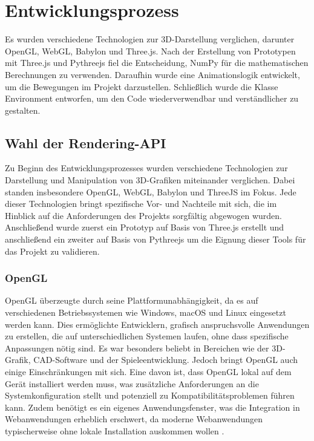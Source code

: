 \section{Entwicklungsprozess}
Es wurden verschiedene Technologien zur 3D-Darstellung verglichen, darunter OpenGL, WebGL, Babylon und Three.js.
Nach der Erstellung von Prototypen mit Three.js und Pythreejs fiel die Entscheidung, NumPy für die mathematischen Berechnungen zu verwenden.
Daraufhin wurde eine Animationslogik entwickelt, um die Bewegungen im Projekt darzustellen. Schließlich wurde die Klasse Environment entworfen,
um den Code wiederverwendbar und verständlicher zu gestalten.

\subsection{Wahl der Rendering-API}
Zu Beginn des Entwicklungsprozesses wurden verschiedene Technologien zur Darstellung und Manipulation von 3D-Grafiken miteinander verglichen.
Dabei standen insbesondere OpenGL, WebGL, Babylon und ThreeJS im Fokus.
Jede dieser Technologien bringt spezifische Vor- und Nachteile mit sich, die im Hinblick auf die Anforderungen des Projekts sorgfältig abgewogen wurden.
Anschließend wurde zuerst ein Prototyp auf Basis von Three.js erstellt und anschließend ein zweiter auf Basis von Pythreejs um die Eignung dieser Tools 
für das Projekt zu validieren. 


\subsubsection{OpenGL}
OpenGL überzeugte durch seine Plattformunabhängigkeit, da es auf verschiedenen Betriebssystemen wie Windows, macOS und Linux eingesetzt werden kann.
Dies ermöglichte Entwicklern, grafisch anspruchsvolle Anwendungen zu erstellen, die auf unterschiedlichen Systemen laufen, ohne dass spezifische Anpassungen nötig sind.
Es war besonders beliebt in Bereichen wie der 3D-Grafik, CAD-Software und der Spieleentwicklung.
Jedoch bringt OpenGL auch einige Einschränkungen mit sich.
Eine davon ist, dass OpenGL lokal auf dem Gerät installiert werden muss,
was zusätzliche Anforderungen an die Systemkonfiguration stellt und potenziell zu Kompatibilitätsproblemen führen kann.
Zudem benötigt es ein eigenes Anwendungsfenster, was die Integration in Webanwendungen erheblich erschwert,
da moderne Webanwendungen typischerweise ohne lokale Installation auskommen wollen .

